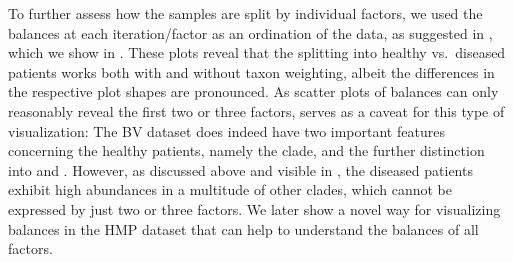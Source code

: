 To further assess how the samples are split by individual factors,
we used the balances at each iteration/factor as an ordination of the data, as suggested in \cite{Washburne2017a},
which we show in .
These plots reveal that the splitting into healthy vs.~diseased patients works both with and without taxon weighting,
albeit the differences in the respective plot shapes are pronounced.
As scatter plots of balances can only reasonably reveal the first two or three factors,
 serves as a caveat for this type of visualization:
The \ac{BV} dataset does indeed have two important features concerning the healthy patients,
namely the  clade, and the further distinction
into  and .
However, as discussed above and visible in ,
the diseased patients exhibit high abundances in a multitude of other clades,
which cannot be expressed by just two or three factors.
We later show a novel way for visualizing balances in the \ac{HMP} dataset
that can help to understand the balances of all factors.

